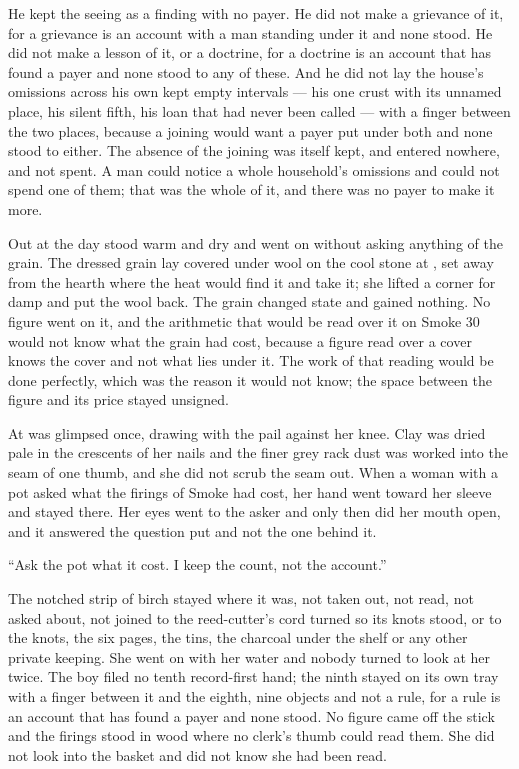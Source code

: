 He kept the seeing as a finding with no payer. He did not make a grievance of it, for a grievance is an account with a man standing under it and none stood. He did not make a lesson of it, or a doctrine, for a doctrine is an account that has found a payer and none stood to any of these. And he did not lay the house's omissions across his own kept empty intervals --- his one crust with its unnamed place, his silent fifth, his loan that had never been called --- with a finger between the two places, because a joining would want a payer put under both and none stood to either. The absence of the joining was itself kept, and entered nowhere, and not spent. A man could notice a whole household's omissions and could not spend one of them; that was the whole of it, and there was no payer to make it more.

\scenebreak

Out at  the day stood warm and dry and went on without asking anything of the grain. The dressed grain lay covered under wool on the cool stone at , set away from the hearth where the heat would find it and take it; she lifted a corner for damp and put the wool back. The grain changed state and gained nothing. No figure went on it, and the arithmetic that would be read over it on Smoke 30 would not know what the grain had cost, because a figure read over a cover knows the cover and not what lies under it. The work of that reading would be done perfectly, which was the reason it would not know; the space between the figure and its price stayed unsigned.

At   was glimpsed once, drawing with the pail against her knee. Clay was dried pale in the crescents of her nails and the finer grey rack dust was worked into the seam of one thumb, and she did not scrub the seam out. When a woman with a pot asked what the firings of Smoke had cost, her hand went toward her sleeve and stayed there. Her eyes went to the asker and only then did her mouth open, and it answered the question put and not the one behind it.

“Ask the pot what it cost. I keep the count, not the account.”

The notched strip of birch stayed where it was, not taken out, not read, not asked about, not joined to the reed-cutter's cord turned so its knots stood, or to the knots, the six pages, the tins, the charcoal under the shelf or any other private keeping. She went on with her water and nobody turned to look at her twice. The boy filed no tenth record-first hand; the ninth stayed on its own tray with a finger between it and the eighth, nine objects and not a rule, for a rule is an account that has found a payer and none stood. No figure came off the stick and the firings stood in wood where no clerk's thumb could read them. She did not look into the basket and did not know she had been read.


